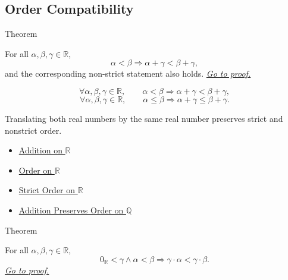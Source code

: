\subsection*{Order Compatibility}

\begin{theorembox}{Theorem}
\begin{theorem}
\label{thm:addition-preserves-order-on-r}
For all $\alpha,\beta,\gamma\in\mathbb{R}$,
\[
\alpha<\beta \Longrightarrow \alpha+\gamma<\beta+\gamma,
\]
and the corresponding non-strict statement also holds.
\hyperref[prf:addition-preserves-order-on-r]{\textit{Go to proof.}}
\end{theorem}
\end{theorembox}

\begin{remark*}
\[
\forall \alpha,\beta,\gamma\in\mathbb{R},\qquad
\alpha<\beta\Longrightarrow \alpha+\gamma<\beta+\gamma,
\]
\[
\forall \alpha,\beta,\gamma\in\mathbb{R},\qquad
\alpha\le\beta\Longrightarrow \alpha+\gamma\le\beta+\gamma.
\]
\end{remark*}

\begin{remark*}[Interpretation]
Translating both real numbers by the same real number preserves strict and nonstrict order.
\end{remark*}

\begin{dependencies}
\begin{itemize}
  \item \hyperref[def:addition-on-r]{Addition on $\mathbb{R}$}
  \item \hyperref[def:order-on-r]{Order on $\mathbb{R}$}
  \item \hyperref[def:strict-order-on-r]{Strict Order on $\mathbb{R}$}
  \item \hyperref[thm:addition-preserves-order-on-q]{Addition Preserves Order on $\mathbb{Q}$}
\end{itemize}
\end{dependencies}

\begin{theorembox}{Theorem}
\begin{theorem}
\label{thm:positive-multiplication-preserves-order-on-r}
For all $\alpha,\beta,\gamma\in\mathbb{R}$,
\[
0_{\mathbb{R}}<\gamma\land\alpha<\beta
\Longrightarrow
\gamma\cdot\alpha<\gamma\cdot\beta.
\]
\hyperref[prf:positive-multiplication-preserves-order-on-r]{\textit{Go to proof.}}
\end{theorem}
\end{theorembox}

